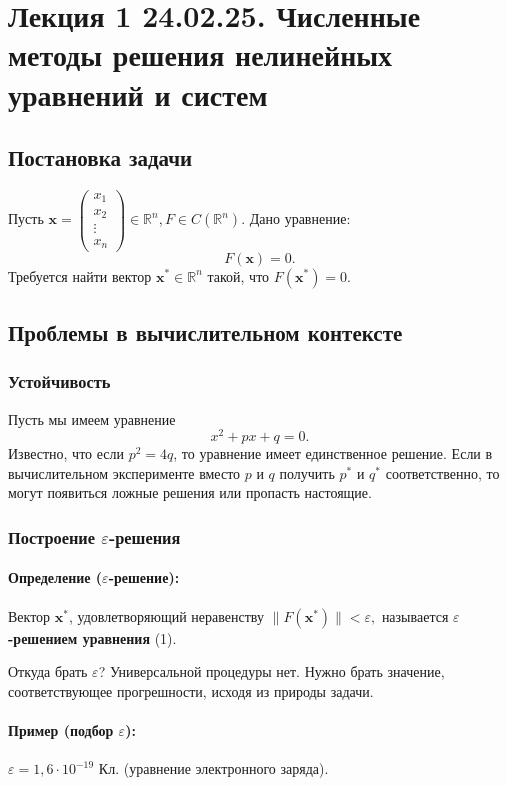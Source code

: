 \section{Лекция 1 24.02.25. Численные методы решения нелинейных уравнений и систем}
\subsection{Постановка задачи}
Пусть $\mathbf{x} = \begin{pmatrix} 
x_1    \\ 
x_2    \\ 
\vdots \\ 
x_n    
\end{pmatrix} \in \mathbb{R}^n, F \in C(\mathbb{R}^n).
$
Дано уравнение:
\begin{equation}
F(\mathbf{x}) = 0. 
\end{equation}
Требуется найти вектор $\mathbf{x^*} \in \mathbb{R}^n$ такой, что $F(\mathbf{x^*}) = 0$.
\subsection{Проблемы в вычислительном контексте}
\subsubsection{Устойчивость}
Пусть мы имеем уравнение
\[
x^2 + px + q = 0.
\]
Известно, что если $p^2 = 4q$,
то уравнение имеет единственное решение.
Если в вычислительном эксперименте вместо $p$ и $q$ получить $p^*$ и $q^*$ соответственно, то могут появиться ложные решения или пропасть настоящие.
\subsubsection{Построение $\varepsilon$-решения}
\paragraph{Определение ($\varepsilon$-решение):} Вектор $\mathbf{x^*}$, удовлетворяющий неравенству
$
\|F(\mathbf{x^*})\| < \varepsilon,
$
называется \textbf{$\varepsilon$-решением уравнения} (1).

Откуда брать $\varepsilon$? Универсальной процедуры нет. Нужно брать значение, соответствующее прогрешности, исходя из природы задачи.
\paragraph{Пример (подбор $\varepsilon$):} 
$\varepsilon = 1,6 \cdot 10^{-19}$ Кл. (уравнение электронного заряда).
